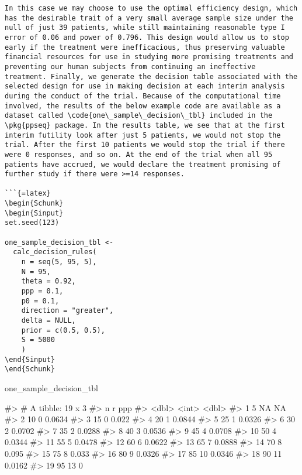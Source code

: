 \begin{Schunk}
\begin{verbatim}
In this case we may choose to use the optimal efficiency design, which has the desirable trait of a very small average sample size under the null of just 39 patients, while still maintaining reasonable type I error of 0.06 and power of 0.796. This design would allow us to stop early if the treatment were inefficacious, thus preserving valuable financial resources for use in studying more promising treatments and preventing our human subjects from continuing an ineffective treatment. Finally, we generate the decision table associated with the selected design for use in making decision at each interim analysis during the conduct of the trial. Because of the computational time involved, the results of the below example code are available as a dataset called \code{one\_sample\_decision\_tbl} included in the \pkg{ppseq} package. In the results table, we see that at the first interim futility look after just 5 patients, we would not stop the trial. After the first 10 patients we would stop the trial if there were 0 responses, and so on. At the end of the trial when all 95 patients have accrued, we would declare the treatment promising of further study if there were >=14 responses.

```{=latex}
\begin{Schunk}
\begin{Sinput}
set.seed(123)

one_sample_decision_tbl <- 
  calc_decision_rules(
    n = seq(5, 95, 5),
    N = 95, 
    theta = 0.92, 
    ppp = 0.1, 
    p0 = 0.1, 
    direction = "greater",
    delta = NULL, 
    prior = c(0.5, 0.5), 
    S = 5000
    )
\end{Sinput}
\end{Schunk}
\end{verbatim}

\begin{Schunk}
\begin{Sinput}
one_sample_decision_tbl
\end{Sinput}
\begin{Soutput}
#> # A tibble: 19 x 3
#>        n     r     ppp
#>    <dbl> <int>   <dbl>
#>  1     5    NA NA     
#>  2    10     0  0.0634
#>  3    15     0  0.022 
#>  4    20     1  0.0844
#>  5    25     1  0.0326
#>  6    30     2  0.0702
#>  7    35     2  0.0288
#>  8    40     3  0.0536
#>  9    45     4  0.0708
#> 10    50     4  0.0344
#> 11    55     5  0.0478
#> 12    60     6  0.0622
#> 13    65     7  0.0888
#> 14    70     8  0.095 
#> 15    75     8  0.033 
#> 16    80     9  0.0326
#> 17    85    10  0.0346
#> 18    90    11  0.0162
#> 19    95    13  0
\end{Soutput}
\end{Schunk}


\end{Schunk}
